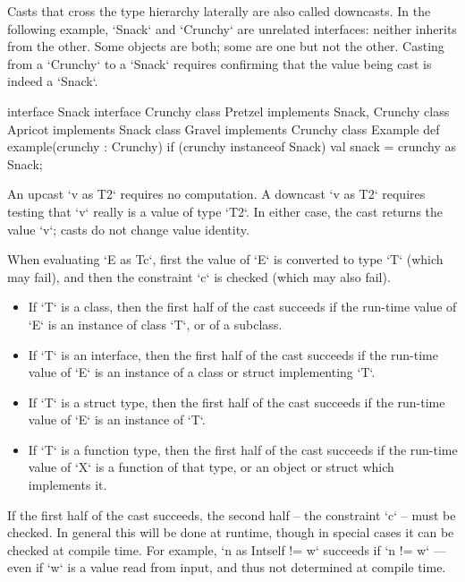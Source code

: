 Casts that cross the type hierarchy laterally are also called downcasts.  In
the following example, \xcd`Snack` and \xcd`Crunchy` are unrelated interfaces:
neither inherits from the other.  Some objects are both; some are one but not
the other.  Casting from a \xcd`Crunchy` to a \xcd`Snack` requires confirming
that the value being cast is indeed a \xcd`Snack`.  
\begin{xten}
interface Snack {}
interface Crunchy {} 
class Pretzel implements Snack, Crunchy{}
class Apricot implements Snack{}
class Gravel  implements Crunchy{}
class Example{
  def example(crunchy : Crunchy) { 
    if (crunchy instanceof Snack) { 
       val snack = crunchy as Snack; 
    } } } 
\end{xten}
%

An upcast \xcd`v as T2` requires no computation.  
A downcast \xcd`v as T2` requires testing that \xcd`v` really is a value of
type \xcd`T2`.  In either case, the cast returns the value \xcd`v`; casts do
not change value identity.


When evaluating \xcd`E as T{c}`, first the value of \xcd`E` is converted to
type \xcd`T` (which may fail), and then the constraint \xcd`{c}` is checked
(which may also fail). 



\begin{itemize}
      
\item If \xcd`T` is a class, then the first half of the cast succeeds if the
      run-time value of \xcd`E` is an instance of class \xcd`T`, or of a
      subclass. 

\item If \xcd`T` is an interface, then the first half of the cast succeeds if
      the run-time value of \xcd`E` is an instance of a class or struct
      implementing 
      \xcd`T`. 

\item If \xcd`T` is a struct type, then the first half of the cast succeeds if
      the run-time value of \xcd`E` is an instance of \xcd`T`.  

\item If \xcd`T` is a function type, then the first half of the cast succeeds
      if the run-time value of \xcd`X` is a function of that type, or an
      object or struct which implements it.
\end{itemize}

If the first half of the cast succeeds, the second half -- the constraint
\xcd`{c}` -- must be checked.  In general this will be done at runtime, though
in special cases it can be checked at compile time.   For example, 
\xcd`n as Int{self != w}` succeeds if \xcd`n != w` --- even if \xcd`w` is a value
read from input, and thus not determined at compile time.

